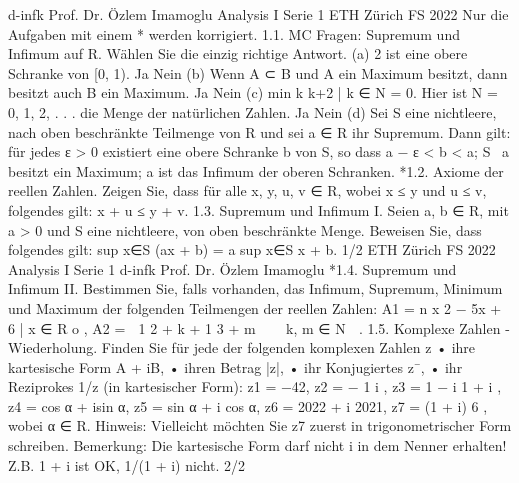 d-infk
Prof. Dr. Özlem Imamoglu
Analysis I
Serie 1
ETH Zürich
FS 2022
Nur die Aufgaben mit einem * werden korrigiert.
1.1. MC Fragen: Supremum und Infimum auf R. Wählen Sie die einzig richtige
Antwort.
(a) 2 ist eine obere Schranke von [0, 1).
 Ja
 Nein
(b) Wenn A ⊂ B und A ein Maximum besitzt, dann besitzt auch B ein Maximum.
 Ja
 Nein
(c) min{
k
k+2 | k ∈ N} = 0. Hier ist N = {0, 1, 2, . . .} die Menge der natürlichen
Zahlen.
 Ja
 Nein
(d) Sei S eine nichtleere, nach oben beschränkte Teilmenge von R und sei a ∈ R ihr
Supremum. Dann gilt:
 für jedes ε > 0 existiert eine obere Schranke b von S, so dass a − ε < b < a;
 S \ {a} besitzt ein Maximum;
 a ist das Infimum der oberen Schranken.
*1.2. Axiome der reellen Zahlen. Zeigen Sie, dass für alle x, y, u, v ∈ R, wobei
x ≤ y und u ≤ v, folgendes gilt:
x + u ≤ y + v.
1.3. Supremum und Infimum I. Seien a, b ∈ R, mit a > 0 und S eine nichtleere,
von oben beschränkte Menge. Beweisen Sie, dass folgendes gilt:
sup
x∈S
(ax + b) = a sup
x∈S
x + b.
1/2         
ETH Zürich
FS 2022
Analysis I
Serie 1
d-infk
Prof. Dr. Özlem Imamoglu
*1.4. Supremum und Infimum II. Bestimmen Sie, falls vorhanden, das Infimum,
Supremum, Minimum und Maximum der folgenden Teilmengen der reellen Zahlen:
A1 =
n
x
2 − 5x + 6 | x ∈ R
o
,
A2 =

1
2 + k
+
1
3 + m


 k, m ∈ N

.
1.5. Komplexe Zahlen - Wiederholung. Finden Sie für jede der folgenden
komplexen Zahlen z
• ihre kartesische Form A + iB,
• ihren Betrag |z|,
• ihr Konjugiertes z¯,
• ihr Reziprokes 1/z (in kartesischer Form):
z1 = −42, z2 = −
1
i
, z3 =
1 − i
1 + i
,
z4 = cos α + isin α, z5 = sin α + i cos α,
z6 = 2022 + i
2021, z7 = (1 + i)
6
,
wobei α ∈ R.
Hinweis: Vielleicht möchten Sie z7 zuerst in trigonometrischer Form schreiben.
Bemerkung: Die kartesische Form darf nicht i in dem Nenner erhalten! Z.B. 1 + i ist
OK, 1/(1 + i) nicht.
2/2
